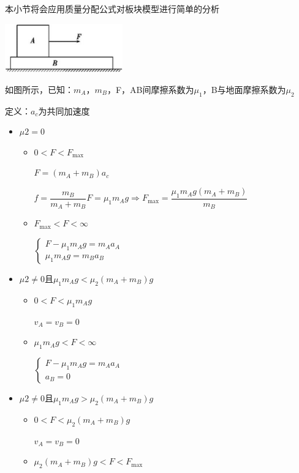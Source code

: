\begin{problemset}
	本小节将会应用质量分配公式对板块模型进行简单的分析
\begin{center}
	\includegraphics[width=2in]{media/33.png}
\end{center}
	如图所示，已知：$m_A$，$m_B$，F，AB间摩擦系数为$\mu _1$，B与地面摩擦系数为$\mu _2$

	定义：$a_c$为共同加速度
	\begin{itemize}
		\item $\mu 2=0$
		\begin{itemize}
			\item $0<F<F_{\max }$
			
				$F=\left(m_{A}+m_{B}\right) a_{c} $

				$f=\dfrac{m_{B}}{m_{A}+m_{B}} F=\mu_{1} m_{A} g \Rightarrow F_{\max }=\dfrac{\mu_{1} m_{A} g\left(m_{A}+m_{B}\right)}{m_{B}}$
			\item $F_{\max }<F<\infty$
			
				$\left\{\begin{array}{c}F-\mu_{1} m_{A} g=m_{A} a_{A} \\ \mu_{1} m_{A} g=m_{B} a_{B}\end{array}\right.$
		\end{itemize}
		\item $\mu 2\neq 0$且$\mu_{1} m_{A} g<\mu_{2}\left(m_{A}+m_{B}\right) g$
		\begin{itemize}
			\item $0<F<\mu_{1} m_{A} g$
			
				$v_{A}=v_{B}=0$
			\item $\mu_{1} m_{A} g<F<\infty$
			
				$\left\{\begin{array}{c}F-\mu_{1} m_{A} g=m_{A} a_{A} \\ a_{B}=0\end{array}\right.$
		\end{itemize}
		\item $\mu 2\neq 0$且$\mu_{1} m_{A} g>\mu_{2}\left(m_{A}+m_{B}\right) g$
		\begin{itemize}
			\item $0<F<\mu_{2}\left(m_{A}+m_{B}\right) g$
				
				$v_{A}=v_{B}=0$
			\item $\mu_{2}\left(m_{A}+m_{B}\right) g<F<F_{\max }$
				

\end{itemize}
\end{itemize}
\end{problemset}
